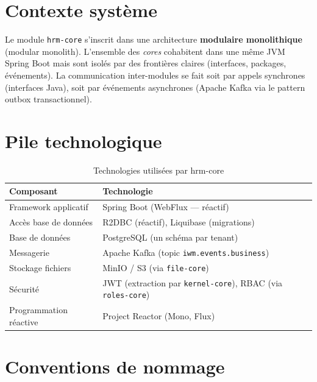 \documentclass[a4paper,12pt,openany]{book}
\begin{document}
    \section{Contexte système}

    Le module \texttt{hrm-core} s'inscrit dans une architecture \textbf{modulaire monolithique} (modular monolith). L'ensemble des \textit{cores} cohabitent dans une même JVM Spring Boot mais sont isolés par des frontières claires (interfaces, packages, événements). La communication inter-modules se fait soit par appels synchrones (interfaces Java), soit par événements asynchrones (Apache Kafka via le pattern outbox transactionnel).

    \section{Pile technologique}

    \begin{table}[H]
        \centering
        \caption{Technologies utilisées par hrm-core}
        \label{tab:stack}
        \begin{tabularx}{\textwidth}{lX}
    \toprule
    \textbf{Composant} & \textbf{Technologie} \\
    \midrule
    Framework applicatif   & Spring Boot (WebFlux — réactif) \\
    Accès base de données  & R2DBC (réactif), Liquibase (migrations) \\
    Base de données        & PostgreSQL (un schéma par tenant) \\
    Messagerie             & Apache Kafka (topic \texttt{iwm.events.business}) \\
    Stockage fichiers      & MinIO / S3 (via \texttt{file-core}) \\
    Sécurité               & JWT (extraction par \texttt{kernel-core}), RBAC (via \texttt{roles-core}) \\
    Programmation réactive & Project Reactor (Mono, Flux) \\
    \bottomrule
        \end{tabularx}
    \end{table}

    \section{Conventions de nommage}
\end{document}
